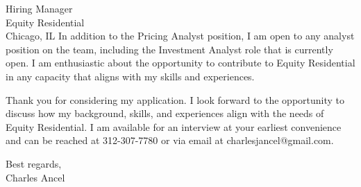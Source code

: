 \documentclass{letter}
\begin{document}
\begin{letter}{Hiring Manager\\Equity Residential\\Chicago, IL}
In addition to the Pricing Analyst position, I am open to any analyst position on the team, including the Investment Analyst role that is currently open. I am enthusiastic about the opportunity to contribute to Equity Residential in any capacity that aligns with my skills and experiences.

Thank you for considering my application. I look forward to the opportunity to discuss how my background, skills, and experiences align with the needs of Equity Residential. I am available for an interview at your earliest convenience and can be reached at 312-307-7780 or via email at charlesjancel@gmail.com.

\begin{flushleft}
Best regards,\\
Charles Ancel
\end{flushleft}

\end{letter}
\end{document}
